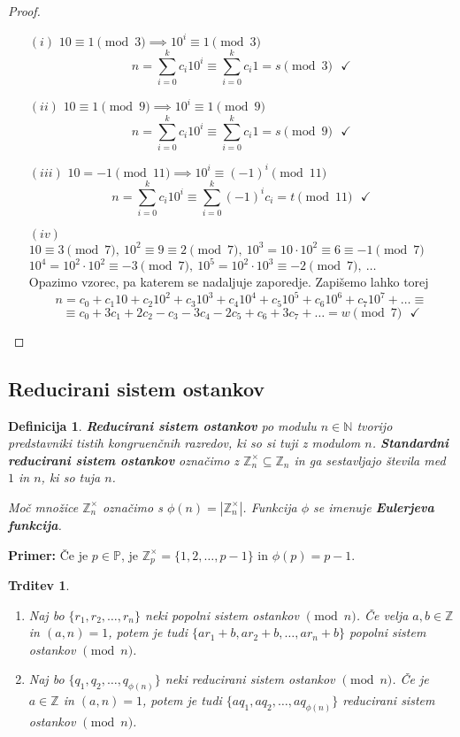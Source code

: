 \documentclass[12pt, a4paper]{article}
\newtheorem{defi}{Definicija}
\newtheorem{trd}{Trditev}
\newenvironment{prim}[1][]{\par\medskip\noindent \textbf{Primer: }}{\medskip}
\begin{document}
\begin{proof}
\begin{itemize}
\item[$(i)$] $10\equiv 1 \pmod 3\implies 10^{i}\equiv 1 \pmod 3 $
$$ n=\sum_{i=0}^{k}c_{i}10^{i} \equiv \sum_{i=0}^{k}c_{i}1 =s\pmod 3 \ \ \ \checkmark$$
\item[$(ii)$] $10\equiv 1 \pmod 9 \implies 10^{i}\equiv 1\pmod 9$
$$ n=\sum_{i=0}^{k}c_{i}10^{i} \equiv \sum_{i=0}^{k}c_{i}1 =s\pmod 9 \ \ \ \checkmark$$
\item[$(iii)$] $10=-1\pmod{11} \implies 10^{i}\equiv (-1)^{i} \pmod{11}$
$$ n=\sum_{i=0}^{k}c_{i}10^{i} \equiv \sum_{i=0}^{k}(-1)^{i}c_{i} =t\pmod{11} \ \ \ \checkmark$$
\item[$(iv)$] $10\equiv 3 \pmod 7,\ 10^{2}\equiv 9\equiv 2\pmod 7,\ 10^{3}=10\cdot 10^{2}\equiv 6\equiv -1 \pmod7$\\
$10^{4}=10^{2}\cdot10^{2}\equiv -3\pmod7,\ 10^{5}=10^{2}\cdot 10^{3}\equiv -2 \pmod 7,\ \ldots$\\
Opazimo vzorec, pa katerem se nadaljuje zaporedje. Zapišemo lahko torej
$$ n=c_{0}+c_{1}10+c_{2}10^{2}+c_{3}10^{3}+c_{4}10^{4}+c_{5}10^{5}+c_{6}10^{6}+c_{7}10^{7}+\ldots\equiv$$
$$ \equiv c_{0}+3c_{1}+2c_{2}-c_{3}-3c_{4}-2c_{5}+c_{6}+3c_{7}+\ldots = w\pmod 7 \ \ \ \checkmark$$
\end{itemize}
\end{proof}

\subsection{Reducirani sistem ostankov}

\begin{defi}
\textbf{Reducirani sistem ostankov} po modulu $n\in \mathbb{N}$ tvorijo predstavniki tistih kongruenčnih razredov, ki so si tuji z modulom $n$. \textbf{Standardni reducirani sistem ostankov} označimo z $\mathbb{Z}_{n}^{\times}\subseteq \mathbb{Z}_{n}$ in ga sestavljajo števila med $1$ in $n$, ki so tuja $n$.

\noindent
Moč množice $\mathbb{Z}_{n}^{\times}$ označimo s $\phi(n)=|\mathbb{Z}_{n}^{\times}|$. Funkcija $\phi$ se imenuje \textbf{Eulerjeva funkcija}.
\end{defi}

\begin{prim}
Če je $p\in \mathbb{P}$, je $\mathbb{Z}_{p}^{\times}=\{1,2,\ldots,p-1\}$ in $\phi(p)=p-1$.
\end{prim}

\begin{trd}
\label{rsistem}
\begin{enumerate}
\item Naj bo $\{r_{1},r_{2},\ldots,r_{n}\}$ neki popolni sistem ostankov $\pmod n$. Če velja $a,b\in \mathbb{Z}$ in $(a,n)=1$, potem je tudi $\{ar_{1}+b,ar_{2}+b,\ldots,ar_{n}+b\}$ popolni sistem ostankov $\pmod n$.
\item Naj bo $\{q_{1},q_{2},\ldots,q_{\phi(n)}\}$ neki reducirani sistem ostankov $\pmod n$. Če je $a\in \mathbb{Z}$ in $(a,n)=1$, potem je tudi $\{aq_{1},aq_{2},\ldots,aq_{\phi(n)}\}$ reducirani sistem ostankov $\pmod n$.
\end{enumerate}
\end{trd}
\end{document}
